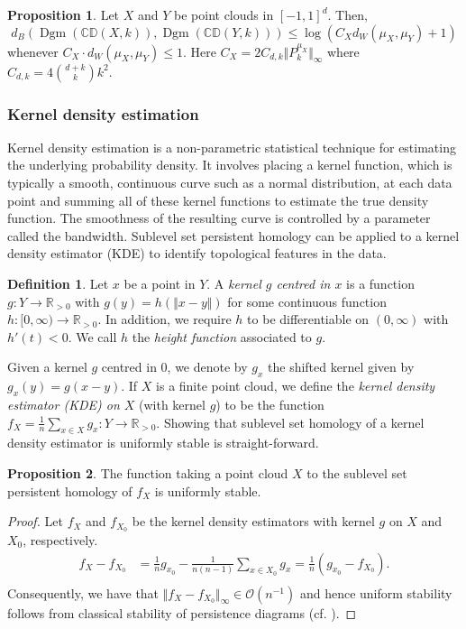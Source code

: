 \documentclass[10pt,a4paper]{article}
\theoremstyle{definition}
\newtheorem{defn}[thm]{Definition}
\newtheorem{prop}{Proposition}[thm]
\newcommand{\posreals}{\ensuremath{\mathbb{R}_{>0}}}
\begin{document}
\begin{prop}
	Let $X$ and $Y$ be point clouds in $[-1,1]^d$. Then,
	$$
	d_B\left(\operatorname{Dgm}(\mathbb{CD}(X,k)), \operatorname{Dgm}(\mathbb{CD}(Y,k))\right)\leq\log(C_X d_W(\mu_X, \mu_Y)+1)
	$$
	whenever $C_X\cdot d_W(\mu_X, \mu_Y)\leq 1$. Here $C_X = 2C_{d,k}\Vert P_k^{\mu_X}\Vert_\infty$ where $C_{d,k} = 4\binom{d+k}{k}k^2$.
\end{prop}



\subsubsection{Kernel density estimation}
Kernel density estimation is a non-parametric statistical technique for estimating the underlying probability density. It involves placing a kernel function, which is typically a smooth, continuous curve such as a normal distribution, at each data point and summing all of these kernel functions to estimate the true density function. The smoothness of the resulting curve is controlled by a parameter called the bandwidth. Sublevel set persistent homology can be applied to a kernel density estimator (KDE) to identify topological features in the data.

\begin{defn}
	Let $x$ be a point in $Y$. A \textit{kernel $g$ centred in $x$} is a function $g\colon Y\to\posreals$ with $g(y)=h\left(\Vert x-y\Vert\right)$ for some continuous function $h\colon[0,\infty)\to\posreals$. In addition, we require $h$ to be differentiable on $(0, \infty)$ with $h'(t)<0$. We call $h$ the \textit{height function} associated to $g$.
\end{defn}

Given a kernel $g$ centred in $0$, we denote by $g_x$ the shifted kernel given by $g_x(y)=g(x-y)$. If $X$ is a finite point cloud, we define the \textit{kernel density estimator (KDE) on $X$} (with kernel $g$) to be the function $f_X=\frac{1}{n}\sum_{x\in X}g_x\colon Y\to\posreals$. Showing that sublevel set homology of a kernel density estimator is uniformly stable is straight-forward.

\begin{prop}
	The function taking a point cloud $X$ to the sublevel set persistent homology of $f_X$ is uniformly stable.
\end{prop}
\begin{proof}
	Let $f_X$ and $f_{X_0}$ be the kernel density estimators with kernel $g$ on $X$ and $X_0$, respectively.
	\begin{align*}
		f_X - f_{X_0} &= \frac{1}{n}g_{x_0} -\frac{1}{n(n-1)}\sum_{x\in X_0}g_x
		= \frac{1}{n}\left(g_{x_0} - f_{X_0}\right). \\
	\end{align*}
	Consequently, we have that $\Vert f_X - f_{X_0}\Vert_\infty\in\mathcal{O}(n^{-1})$ and hence uniform stability follows from classical stability of persistence diagrams (cf. \autocite{cohen2005stability}).
\end{proof}
\end{document}
